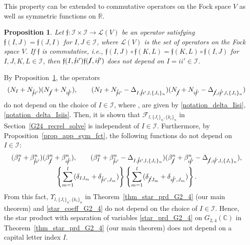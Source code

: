 \documentclass[pdftex]{sigma}
\numberwithin{equation}{section}
\newtheorem{Proposition}[Theorem]{Proposition}
 { \theoremstyle{definition}
\newtheorem{Definition}[Theorem]{Definition}
\newtheorem{Note}[Theorem]{Note}
\newtheorem{Example}[Theorem]{Example}
\newtheorem{Remark}[Theorem]{Remark} }
\begin{document}
This property can be extended to commutative operators on the Fock space $V$ as well as symmetric functions on $\mathbb{R}$.
\begin{Proposition}\label{cor_app_sym_opr}
Let
$
\mathfrak{f}\colon
\mathcal{I}
\times
\mathcal{I}
\to
\mathcal{L}(V)
$
be an operator satisfying
$
\mathfrak{f}(I,J)
=
\mathfrak{f}(J,I)
$
for
$
I,J
\in
\mathcal{I}
$,
where $\mathcal{L}(V)$ is the set of operators on the Fock space $V$.
If $\mathfrak{f}$ is commutative, i.e.,
$
\mathfrak{f}(I,J)
\circ
\mathfrak{f}(K,L)
=
\mathfrak{f}(K,L)
\circ
\mathfrak{f}(I,J)
$
for $I,J,K,L\in\mathcal{I}$, then
$
\mathfrak{f}(I,\cancel{i}i')
\mathfrak{f}(\cancel{I},i\cancel{i}')
$
does not depend on
$
I
=
ii'
\in
\mathcal{I}
$.
\end{Proposition}

By Proposition~\ref{cor_app_sym_opr}, the operators
\begin{align*}
 (
 N_{I}
 +
 N_{\cancel{i}i'}
 )
 (
 N_{\cancel{I}}
 +
 N_{i\cancel{i}'}
 ),
 \qquad
 (
 N_{I}
 +
 N_{\cancel{i}i'}
 -
 \Delta_{
 I,
 \cancel{i}i',
 l,
 \{
 J_{i}
 \}_{n}
 }
 )
 (
 N_{\cancel{I}}
 +
 N_{i\cancel{i}'}
 -
 \Delta_{
 \cancel{I},
 i\cancel{i}',
 l,
 \{
 J_{i}
 \}_{n}
 }
 )
\end{align*}
do not depend on the choice of $I\in\mathcal{I}$, where
,
are given by \eqref{notation_delta_Iisi}, \eqref{notation_delta_Isiis}. Then, it is shown that
$
\mathcal{F}_{
l,
\{
 J_{i}
\}_{n},
\{
 k_{i}
\}_{n}
}
$
in Section~\ref{G24_recrel_solve} is independent of
$
I
\in
\mathcal{I}
$.
Furthermore, by Proposition~\ref{prop_app_sym_fct}, the following functions do not depend on $I\in\mathcal{I}$:
\begin{gather*}
 (
\beta_{I}^{n}
+
\beta_{\cancel{i}i'}^{n}
 )
 (
\beta_{\cancel{I}}^{n}
+
\beta_{i\cancel{i}'}^{n}
 ),
\qquad
 (
\beta_{I}^{n}
+
\beta_{\cancel{i}i'}^{n}
-
\Delta_{
I,
\cancel{i}i',
l,
\{
J_{i}
\}_{n}
}
 )
 (
\beta_{\cancel{I}}^{n}
+
\beta_{i\cancel{i}'}^{n}
-
\Delta_{
\cancel{I},
i\cancel{i}',
l,
\{
J_{i}
\}_{n}
}
 ),
\\
\left\{
\sum_{m=1}^{l}
 (
\delta_{IJ_{m}}
+
\delta_{\cancel{i}i',J_{m}}
 )
\right\}
\left\{
\sum_{m=1}^{l}
 (
\delta_{\cancel{I}J_{m}}
+
\delta_{i\cancel{i}',J_{m}}
 )
\right\}.
\end{gather*}
From this fact,
$
\Upsilon_{
l,
\{J_{i}\}_{n},
\{k_{i}\}_{n}
}
$
in Theorem~\ref{thm_star_prd_G2_4} (our main theorem) and \eqref{star_coeff_G2_4}
do not depend on the choice of
$
I
\in
\mathcal{I}
$.
Hence, the star product with separation of variables \eqref{star_prd_G2_4} on $G_{2,4}(\mathbb{C})$ in Theorem~\ref{thm_star_prd_G2_4} (our main theorem) does not depend on a capital letter index $I$.
\end{document}
